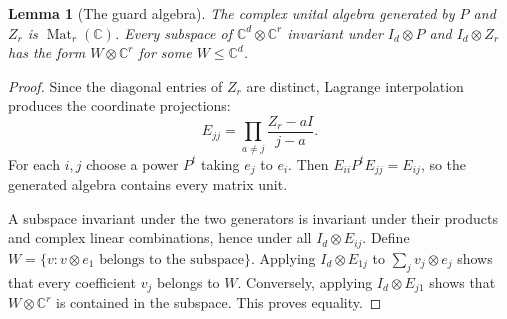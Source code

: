 \documentclass[11pt,letterpaper]{article}
\newtheorem{lemma}[theorem]{Lemma}
\theoremstyle{definition}
\theoremstyle{remark}
\newcommand{\C}{\mathbb C}
\newcommand{\Mat}{\operatorname{Mat}}
\begin{document}
\begin{lemma}[The guard algebra]\label{ste:ee:lem:guardalgebra}
The complex unital algebra generated by $P$ and $Z_r$ is
$\Mat_r(\C)$. Every subspace of $\C^d\otimes\C^r$ invariant under
$I_d\otimes P$ and $I_d\otimes Z_r$ has the form $W\otimes\C^r$ for some
$W\leq\C^d$.
\end{lemma}
\begin{proof}
Since the diagonal entries of $Z_r$ are distinct, Lagrange interpolation produces
the coordinate projections:
\[
 E_{jj}=\prod_{a\ne j}\frac{Z_r-aI}{j-a}.
\]
For each $i,j$ choose a power $P^t$ taking $e_j$ to $e_i$. Then
$E_{ii}P^tE_{jj}=E_{ij}$, so the generated algebra contains every matrix unit.

A subspace invariant under the two generators is invariant under their products
and complex linear combinations, hence under all $I_d\otimes E_{ij}$. Define
$W=\{v:v\otimes e_1\text{ belongs to the subspace}\}$. Applying
$I_d\otimes E_{1j}$ to $\sum_jv_j\otimes e_j$ shows that every coefficient
$v_j$ belongs to $W$. Conversely, applying $I_d\otimes E_{j1}$ shows that
$W\otimes\C^r$ is contained in the subspace. This proves equality.
\end{proof}
\end{document}
